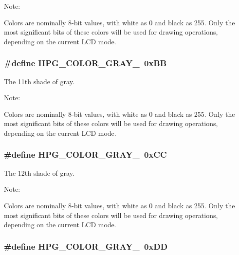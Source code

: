 \begin{Desc}
\item[Note: ]\par
Colors are nominally 8-bit values, with white as 0 and black as 255. Only the most significant bits of these colors will be used for drawing operations, depending on the current LCD mode. \end{Desc}
\subsubsection{\setlength{\rightskip}{0pt plus 5cm}\#define HPG\_\-COLOR\_\-GRAY\_\ 0x\-BB}\label{hpgraphics_8h_a13}


The 11th shade of gray.

\begin{Desc}
\item[Note: ]\par
Colors are nominally 8-bit values, with white as 0 and black as 255. Only the most significant bits of these colors will be used for drawing operations, depending on the current LCD mode. \end{Desc}
\subsubsection{\setlength{\rightskip}{0pt plus 5cm}\#define HPG\_\-COLOR\_\-GRAY\_\ 0x\-CC}\label{hpgraphics_8h_a14}


The 12th shade of gray.

\begin{Desc}
\item[Note: ]\par
Colors are nominally 8-bit values, with white as 0 and black as 255. Only the most significant bits of these colors will be used for drawing operations, depending on the current LCD mode. \end{Desc}
\subsubsection{\setlength{\rightskip}{0pt plus 5cm}\#define HPG\_\-COLOR\_\-GRAY\_\ 0x\-DD}\label{hpgraphics_8h_a15}


